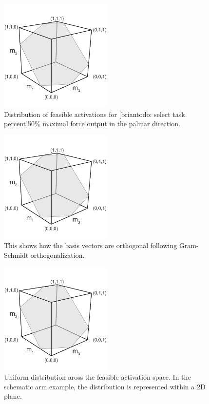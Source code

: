 \begin{figure}[htbp]
\centering
\includegraphics[width=0.5\textwidth,page=7]{sections/figs/HitandRunSchematics_all.pdf}
\caption{Distribution of feasible activations for [briantodo: select task percent]50\% maximal force output in the palmar direction.}
\label{fig:prebasis_cube}
\end{figure}

\begin{figure}[htbp]
\centering
\includegraphics[width=0.5\textwidth,page=8]{sections/figs/HitandRunSchematics_all.pdf}
\caption{This shows how the basis vectors are orthogonal following Gram-Schmidt orthogonalization.}
\label{fig:postbasis_cube}
\end{figure}

\begin{figure}[htbp]
\centering
\includegraphics[width=0.5\textwidth,page=9]{sections/figs/HitandRunSchematics_all.pdf}
\caption{Uniform distribution aross the feasible activation space. In the schematic arm example, the distribution is represented within a 2D plane.}
\label{fig:posthitrun_distribution}
\end{figure}



